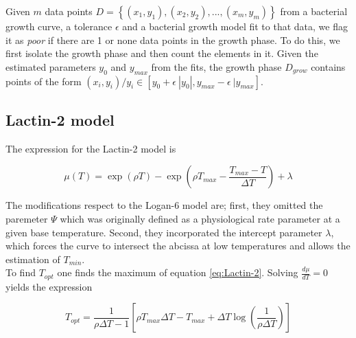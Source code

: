 \documentclass[titlepage,11pt]{article}
\begin{document}
\begin{linenumbers}
			Given $ m $ data points $ D =  \left\{(x_1, y_1), (x_2, y_2), ... , (x_m, y_m)\right\} $ from a bacterial growth curve, a tolerance $ \epsilon $ and a bacterial growth model fit to that data, we flag it as \textit{poor} if there are 1 or none data points in the growth phase. To do this, we first isolate the growth phase and then count the elements in it.  Given the estimated parameters $ y_{0} $ and $ y_{max} $ from the fits, the growth phase $D_{grow} $ contains points of the form $ (x_i, y_i) / y_i \in [y_0 + \epsilon\ |y_0| , y_{max} - \epsilon \ |y_{max}]$. 
			
			\subsection{Lactin-2 model}\label{subsec:Lactin-2}
			The expression for the Lactin-2 model is 
			\begin{linenomath*}
				\begin{equation}\label{eq:Lactin-2}
				\mu(T) = \exp(\rho T) - \exp\left(\rho T_{max} - \frac{T_{max}-T}{\Delta T}\right) + \lambda    
				\end{equation}
			\end{linenomath*}
			
			The modifications respect to the Logan-6 model are; first, they omitted the paremeter $ \Psi $ which was originally defined as a physiological rate parameter at a given base temperature. Second, they incorporated the intercept parameter $ \lambda $, which forces the curve to intersect the abcissa at low temperatures and allows the estimation of $ T_{min} $.\\
			To find $ T_{opt} $ one finds the maximum of equation \ref{eq:Lactin-2}. Solving $ \frac{d\mu}{dT}  = 0$ yields the expression
			\begin{linenomath*}
				\begin{equation}\label{eq:Topt}
				T_{opt} = \frac{1}{\rho\Delta T  -1}\left[\rho T_{max} \Delta T - T_{max} + \Delta T \log\left(\frac{1}{\rho\Delta T }\right) \right]
				\end{equation}
			\end{linenomath*}
		\end{linenumbers}
		
		\newpage
		
		
	
\end{document}
